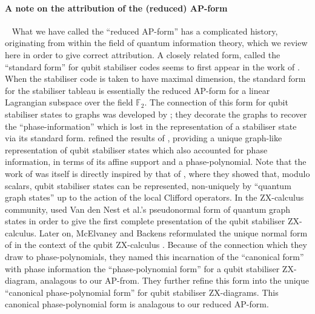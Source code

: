 \paragraph{A note on the attribution of the (reduced) AP-form}\ \newline
What we have called the ``reduced AP-form'' has a complicated history, originating from within the field of quantum information theory, which we review here in order to give correct attribution. A closely related form, called the ``standard form'' for qubit stabiliser codes seems to first appear in the work of \textcite{Cleve1997}.  When the stabiliser code is taken to have maximal dimension, the standard form for the stabiliser tableau is essentially the reduced AP-form for a linear Lagrangian subspace over the field \(\mathbb{F}_2\). The connection of this form for qubit stabiliser states to graphs was developed by \textcite{Elliott2008}; they decorate the graphs to recover the ``phase-information'' which is lost in the representation of a stabiliser state via its standard form.  \textcite{hu_improved_2022} refined the results of \textcite{Elliott2008}, providing a unique graph-like representation of qubit stabiliser states which also accounted for phase information, in terms of its affine support and a phase-polynomial.  Note that the work of \textcite{Elliott2008} was itself is directly inspired by that of \textcite{van_den_nest_graphical_2004}, where they showed that, modulo scalars, qubit stabiliser states can be represented, non-uniquely by ``quantum graph states'' up to the action of the local Clifford operators. 
In the ZX-calculus community, \textcite{backens_zx-calculus_2014} used Van den Nest et al.'s pseudonormal form of quantum graph states in order to give the first complete presentation of the qubit stabiliser ZX-calculus.
Later on, McElvaney and Backens reformulated  the unique normal form of  \textcite{hu_improved_2022} in the context of the qubit ZX-calculus \cite{mcelvanney_complete_2022}. Because of the connection which they draw to phase-polynomials, they named this incarnation of the ``canonical form'' with phase information the  ``phase-polynomial form'' for a qubit stabiliser ZX-diagram, analagous to our AP-from. They further refine this form into the unique  ``canonical phase-polynomial form'' for qubit stabiliser ZX-diagrams.  This canonical phase-polynomial form is analagous to our reduced AP-form. 
